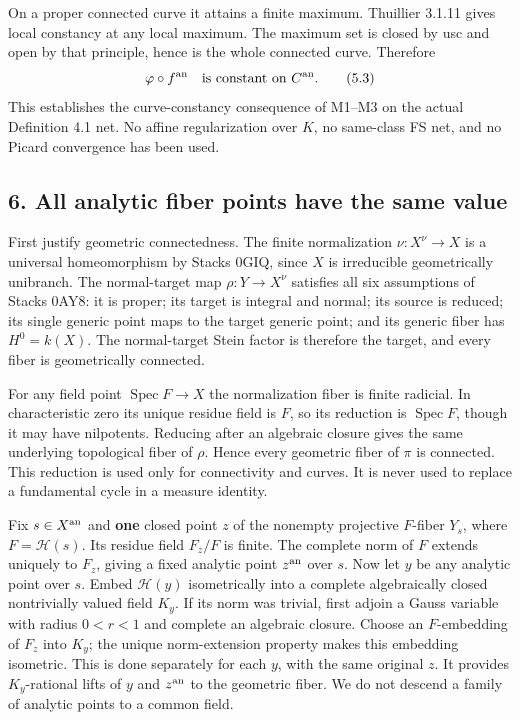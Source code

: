 \documentclass[
  10pt,
]{article}
\begin{document}
On a proper connected curve it attains a finite maximum. Thuillier
3.1.11 gives local constancy at any local maximum. The maximum set is
closed by usc and open by that principle, hence is the whole connected
curve. Therefore
\[\varphi\circ f^{\rm an}\quad\text{is constant on }C^{\rm an}.          \tag{5.3}\]
This establishes the curve-constancy consequence of M1--M3 on the actual
Definition 4.1 net. No affine regularization over \(K\), no same-class
FS net, and no Picard convergence has been used.

\subsection{6. All analytic fiber points have the same
value}\label{all-analytic-fiber-points-have-the-same-value}

First justify geometric connectedness. The finite normalization
\(\nu:X^\nu\to X\) is a universal homeomorphism by Stacks 0GIQ, since
\(X\) is irreducible geometrically unibranch. The normal-target map
\(\rho:Y\to X^\nu\) satisfies all six assumptions of Stacks 0AY8: it is
proper; its target is integral and normal; its source is reduced; its
single generic point maps to the target generic point; and its generic
fiber has \(H^0=k(X)\). The normal-target Stein factor is therefore the
target, and every fiber is geometrically connected.

For any field point \(\operatorname{Spec}F\to X\) the normalization
fiber is finite radicial. In characteristic zero its unique residue
field is \(F\), so its reduction is \(\operatorname{Spec}F\), though it
may have nilpotents. Reducing after an algebraic closure gives the same
underlying topological fiber of \(\rho\). Hence every geometric fiber of
\(\pi\) is connected. This reduction is used only for connectivity and
curves. It is never used to replace a fundamental cycle in a measure
identity.

Fix \(s\in X^{\rm an}\) and \textbf{one} closed point \(z\) of the
nonempty projective \(F\)-fiber \(Y_s\), where \(F=\mathscr H(s)\). Its
residue field \(F_z/F\) is finite. The complete norm of \(F\) extends
uniquely to \(F_z\), giving a fixed analytic point \(z^{\rm an}\) over
\(s\). Now let \(y\) be any analytic point over \(s\). Embed
\(\mathscr H(y)\) isometrically into a complete algebraically closed
nontrivially valued field \(K_y\). If its norm was trivial, first adjoin
a Gauss variable with radius \(0<r<1\) and complete an algebraic
closure. Choose an \(F\)-embedding of \(F_z\) into \(K_y\); the unique
norm-extension property makes this embedding isometric. This is done
separately for each \(y\), with the same original \(z\). It provides
\(K_y\)-rational lifts of \(y\) and \(z^{\rm an}\) to the geometric
fiber. We do not descend a family of analytic points to a common field.
\end{document}

